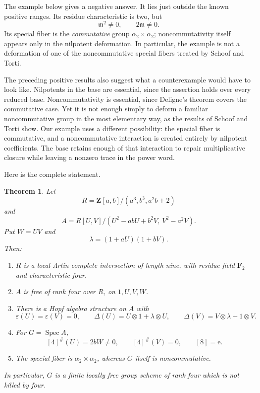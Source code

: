 \documentclass[11pt]{amsart}
\newtheorem{theorem}{Theorem}[section]
\theoremstyle{remark}
\newcommand{\Z}{\mathbf Z}
\newcommand{\F}{\mathbf F}
\newcommand{\Spec}{\operatorname{Spec}}
\newcommand{\eps}{\varepsilon}
\newcommand{\m}{\mathfrak m}
\newcommand{\ot}{\otimes}
\newcommand{\unit}{\mathrm e}
\begin{document}
The example below gives a negative answer.  It lies just outside the
known positive ranges.  Its residue characteristic is two, but
\[
 \m^2\ne0,\qquad 2\m\ne0.
\]
Its special fiber is the \emph{commutative} group
\(\alpha_2\times\alpha_2\); noncommutativity itself appears only in the
nilpotent deformation.  In particular, the example is not a deformation
of one of the noncommutative special fibers treated by Schoof and Torti.

The preceding positive results also suggest what a counterexample would
have to look like.  Nilpotents in the base are essential, since the
assertion holds over every reduced base.  Noncommutativity is essential,
since Deligne's theorem covers the commutative case.  Yet it is not
enough simply to deform a familiar noncommutative group in the most
elementary way, as the results of Schoof and Torti show.  Our example
uses a different possibility: the special fiber is commutative, and a
noncommutative interaction is created entirely by nilpotent
coefficients.  The base retains enough of that interaction to repair
multiplicative closure while leaving a nonzero trace in the power word.

Here is the complete statement.

\begin{theorem}\label{thm:main}
Let
\begin{equation}\label{eq:R}
 R=\Z[a,b]/(a^3,b^3,a^2b+2)
\end{equation}
and
\begin{equation}\label{eq:A}
 A=R[U,V]/(U^2-abU+b^2V,\ V^2-a^2V).
\end{equation}
Put \(W=UV\) and
\begin{equation}\label{eq:lambda}
 \lambda=(1+aU)(1+bV).
\end{equation}
Then:
\begin{enumerate}
\item \(R\) is a local Artin complete intersection of length nine,
with residue field \(\F_2\) and characteristic four.
\item \(A\) is free of rank four over \(R\), on \(1,U,V,W\).
\item There is a Hopf algebra structure on \(A\) with
\[
 \eps(U)=\eps(V)=0,\qquad
 \Delta(U)=U\ot1+\lambda\ot U,\qquad
 \Delta(V)=V\ot\lambda+1\ot V.
\]
\item For \(G=\Spec A\),
\[
 [4]^\#(U)=2bW\ne0,\qquad
 [4]^\#(V)=0,\qquad
 [8]=\unit.
\]
\item The special fiber is \(\alpha_2\times\alpha_2\), whereas \(G\)
itself is noncommutative.
\end{enumerate}
In particular, \(G\) is a finite locally free group scheme of rank four
which is not killed by four.
\end{theorem}
\end{document}
